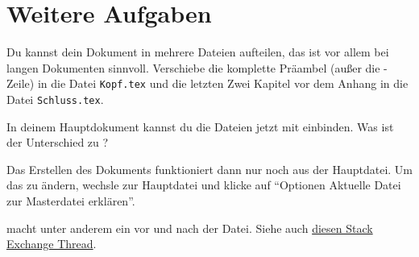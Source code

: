 \section{Weitere Aufgaben}
    \begin{uebung}
        \item Du kannst dein Dokument in mehrere Dateien aufteilen, das ist vor
        allem bei langen Dokumenten sinnvoll. Verschiebe die komplette Präambel
        (außer die -Zeile) in die Datei \texttt{Kopf.tex} und
        die letzten Zwei Kapitel vor dem Anhang in die Datei \texttt{Schluss.tex}.
        
        In deinem Hauptdokument kannst du die Dateien jetzt mit
         einbinden. Was ist der Unterschied zu
        ?
            \begin{hinweis}
                Das Erstellen des Dokuments funktioniert dann nur noch aus der Hauptdatei.
                Um das zu ändern, wechsle zur Hauptdatei und klicke auf
                \enquote{Optionen \textrightarrow{} Aktuelle Datei zur Masterdatei erklären}.
            \end{hinweis}
            \begin{loesung}
                 macht unter anderem ein  vor und nach
                der Datei. Siehe auch \href{http://tex.stackexchange.com/questions/246/when-should-i-use-input-vs-include}{diesen Stack Exchange Thread}.
            \end{loesung}
    \end{uebung}